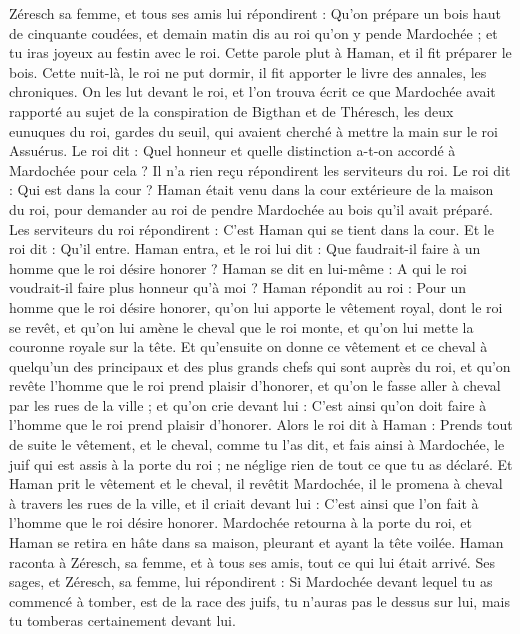 \begin{multicols}{2}
Zéresch sa femme, et tous ses amis lui répondirent : Qu'on prépare un bois haut de cinquante coudées, et demain matin dis au roi qu'on y pende Mardochée ; et tu iras joyeux au festin avec le roi. Cette parole plut à Haman, et il fit préparer le bois.
\VerseOne{}Cette nuit-là, le roi ne put dormir, il fit apporter le livre des annales, les chroniques. On les lut devant le roi,
et l’on trouva écrit ce que Mardochée avait rapporté au sujet de la conspiration de Bigthan et de Théresch, les deux eunuques du roi, gardes du seuil, qui avaient cherché à mettre la main sur le roi Assuérus.
Le roi dit : Quel honneur et quelle distinction a-t-on accordé à Mardochée pour cela ? Il n’a rien reçu répondirent les serviteurs du roi.
Le roi dit : Qui est dans la cour ? Haman était venu dans la cour extérieure de la maison du roi, pour demander au roi de pendre Mardochée au bois qu'il avait préparé.
Les serviteurs du roi répondirent : C’est Haman qui se tient dans la cour. Et le roi dit : Qu'il entre.
Haman entra, et le roi lui dit : Que faudrait-il faire à un homme que le roi désire honorer ? Haman se dit en lui-même : A qui le roi voudrait-il faire plus honneur qu'à moi ?
Haman répondit au roi : Pour un homme que le roi désire honorer,
qu’on lui apporte le vêtement royal, dont le roi se revêt, et qu'on lui amène le cheval que le roi monte, et qu'on lui mette la couronne royale sur la tête.
Et qu'ensuite on donne ce vêtement et ce cheval à quelqu'un des principaux et des plus grands chefs qui sont auprès du roi, et qu'on revête l'homme que le roi prend plaisir d'honorer, et qu'on le fasse aller à cheval par les rues de la ville ; et qu'on crie devant lui : C'est ainsi qu'on doit faire à l'homme que le roi prend plaisir d'honorer.
Alors le roi dit à Haman : Prends tout de suite le vêtement, et le cheval, comme tu l'as dit, et fais ainsi à Mardochée, le juif qui est assis à la porte du roi ; ne néglige rien de tout ce que tu as déclaré.
Et Haman prit le vêtement et le cheval, il revêtit Mardochée, il le promena à cheval à travers les rues de la ville, et il criait devant lui : C'est ainsi que l’on fait à l'homme que le roi désire honorer.
Mardochée retourna à la porte du roi, et Haman se retira en hâte dans sa maison, pleurant et ayant la tête voilée.
Haman raconta à Zéresch, sa femme, et à tous ses amis, tout ce qui lui était arrivé. Ses sages, et Zéresch, sa femme, lui répondirent : Si Mardochée devant lequel tu as commencé à tomber, est de la race des juifs, tu n'auras pas le dessus sur lui, mais tu tomberas certainement devant lui.

\end{multicols}
